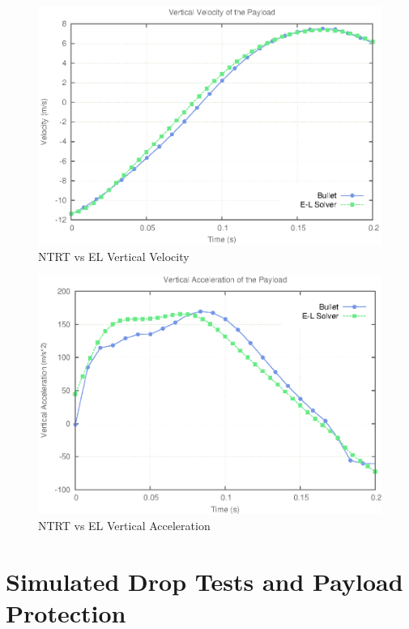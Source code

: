 \begin{figure}[htb]
   \centering
   \includegraphics[width=0.8\columnwidth]{tex/images/landing/bulletVsEL/Velocities}
   \caption{NTRT vs EL Vertical Velocity}
   \label{fig:vsVelocity}
\end{figure}
\begin{figure}[htb]
   \centering
   \includegraphics[width=0.8\columnwidth]{tex/images/landing/bulletVsEL/VelocityDerivatives_SimVsEL}
   \caption{NTRT vs EL Vertical Acceleration}
   \label{fig:vsAccelerations}
\end{figure}


\section{Simulated Drop Tests and Payload Protection}


